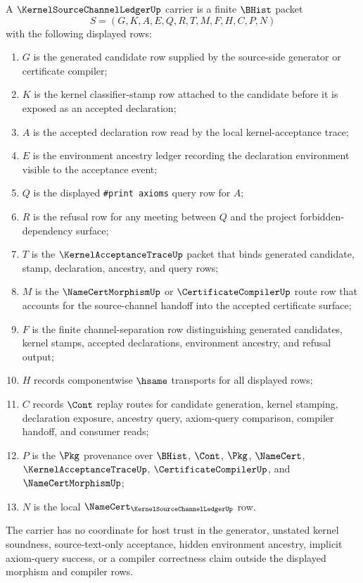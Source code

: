\begin{definition}
\label{def:kernel-source-channel-ledger-carrier}
A $\KernelSourceChannelLedgerUp$ carrier is a finite $\BHist$ packet
$$
S=(G,K,A,E,Q,R,T,M,F,H,C,P,N)
$$
with the following displayed rows:
\begin{enumerate}
\item $G$ is the generated candidate row supplied by the source-side generator or certificate compiler;
\item $K$ is the kernel classifier-stamp row attached to the candidate before it is exposed as an accepted declaration;
\item $A$ is the accepted declaration row read by the local kernel-acceptance trace;
\item $E$ is the environment ancestry ledger recording the declaration environment visible to the acceptance event;
\item $Q$ is the displayed \texttt{\#print axioms} query row for $A$;
\item $R$ is the refusal row for any meeting between $Q$ and the project forbidden-dependency surface;
\item $T$ is the $\KernelAcceptanceTraceUp$ packet that binds generated candidate, stamp, declaration, ancestry, and query rows;
\item $M$ is the $\NameCertMorphismUp$ or $\CertificateCompilerUp$ route row that accounts for the source-channel handoff into the accepted certificate surface;
\item $F$ is the finite channel-separation row distinguishing generated candidates, kernel stamps, accepted declarations, environment ancestry, and refusal output;
\item $H$ records componentwise $\hsame$ transports for all displayed rows;
\item $C$ records $\Cont$ replay routes for candidate generation, kernel stamping, declaration exposure, ancestry query, axiom-query comparison, compiler handoff, and consumer reads;
\item $P$ is the $\Pkg$ provenance over $\BHist$, $\Cont$, $\Pkg$, $\NameCert$, $\KernelAcceptanceTraceUp$, $\CertificateCompilerUp$, and $\NameCertMorphismUp$;
\item $N$ is the local $\NameCert_{\KernelSourceChannelLedgerUp}$ row.
\end{enumerate}
The carrier has no coordinate for host trust in the generator, unstated kernel soundness, source-text-only acceptance, hidden environment ancestry, implicit axiom-query success, or a compiler correctness claim outside the displayed morphism and compiler rows.
\end{definition}

